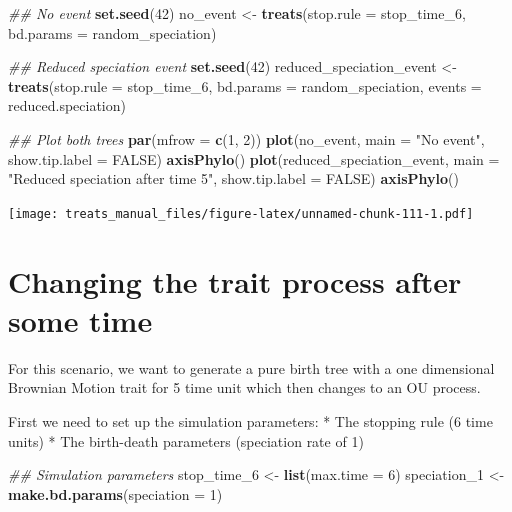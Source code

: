 \documentclass[
]{book}
\newenvironment{Shaded}{\begin{snugshade}}{\end{snugshade}}
\newcommand{\CommentTok}[1]{\textcolor[rgb]{0.56,0.35,0.01}{\textit{#1}}}
\newcommand{\DataTypeTok}[1]{\textcolor[rgb]{0.13,0.29,0.53}{#1}}
\newcommand{\DecValTok}[1]{\textcolor[rgb]{0.00,0.00,0.81}{#1}}
\newcommand{\KeywordTok}[1]{\textcolor[rgb]{0.13,0.29,0.53}{\textbf{#1}}}
\newcommand{\NormalTok}[1]{#1}
\newcommand{\OtherTok}[1]{\textcolor[rgb]{0.56,0.35,0.01}{#1}}
\newcommand{\StringTok}[1]{\textcolor[rgb]{0.31,0.60,0.02}{#1}}
\begin{document}
\begin{Shaded}
\begin{Highlighting}[]
\CommentTok{\#\# No event}
\KeywordTok{set.seed}\NormalTok{(}\DecValTok{42}\NormalTok{)}
\NormalTok{no\_event \textless{}{-}}\StringTok{ }\KeywordTok{treats}\NormalTok{(}\DataTypeTok{stop.rule =}\NormalTok{ stop\_time\_}\DecValTok{6}\NormalTok{,}
                 \DataTypeTok{bd.params =}\NormalTok{ random\_speciation)}

\CommentTok{\#\# Reduced speciation event}
\KeywordTok{set.seed}\NormalTok{(}\DecValTok{42}\NormalTok{)}
\NormalTok{reduced\_speciation\_event \textless{}{-}}\StringTok{ }\KeywordTok{treats}\NormalTok{(}\DataTypeTok{stop.rule =}\NormalTok{ stop\_time\_}\DecValTok{6}\NormalTok{,}
                                 \DataTypeTok{bd.params =}\NormalTok{ random\_speciation,}
                                 \DataTypeTok{events    =}\NormalTok{ reduced.speciation)}

\CommentTok{\#\# Plot both trees}
\KeywordTok{par}\NormalTok{(}\DataTypeTok{mfrow =} \KeywordTok{c}\NormalTok{(}\DecValTok{1}\NormalTok{, }\DecValTok{2}\NormalTok{))}
\KeywordTok{plot}\NormalTok{(no\_event, }\DataTypeTok{main =} \StringTok{"No event"}\NormalTok{, }\DataTypeTok{show.tip.label =} \OtherTok{FALSE}\NormalTok{)}
\KeywordTok{axisPhylo}\NormalTok{()}
\KeywordTok{plot}\NormalTok{(reduced\_speciation\_event, }\DataTypeTok{main =} \StringTok{"Reduced speciation after time 5"}\NormalTok{, }\DataTypeTok{show.tip.label =} \OtherTok{FALSE}\NormalTok{)}
\KeywordTok{axisPhylo}\NormalTok{()}
\end{Highlighting}
\end{Shaded}

\texttt{[image: treats\_manual\_files/figure-latex/unnamed-chunk-111-1.pdf]}

\hypertarget{EG_change_trait}{%
\section{Changing the trait process after some time}\label{EG_change_trait}}

For this scenario, we want to generate a pure birth tree with a one dimensional Brownian Motion trait for 5 time unit which then changes to an OU process.

First we need to set up the simulation parameters:
* The stopping rule (6 time units)
* The birth-death parameters (speciation rate of 1)

\begin{Shaded}
\begin{Highlighting}[]
\CommentTok{\#\# Simulation parameters}
\NormalTok{stop\_time\_}\DecValTok{6}\NormalTok{ \textless{}{-}}\StringTok{ }\KeywordTok{list}\NormalTok{(}\DataTypeTok{max.time =} \DecValTok{6}\NormalTok{)}
\NormalTok{speciation\_}\DecValTok{1}\NormalTok{ \textless{}{-}}\StringTok{ }\KeywordTok{make.bd.params}\NormalTok{(}\DataTypeTok{speciation =} \DecValTok{1}\NormalTok{)}
\end{Highlighting}
\end{Shaded}
\end{document}

